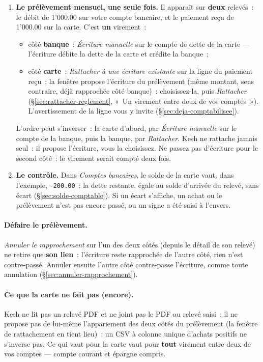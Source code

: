 \documentclass[a4paper,11pt,oneside]{article}
\begin{document}
\begin{enumerate}
    \item \textbf{Le prélèvement mensuel, une seule fois.} Il apparaît sur \textbf{deux} relevés~: le débit de 1'000.00 sur votre compte bancaire, et le paiement reçu de 1'000.00 sur la carte. C'est \textbf{un} virement~:
    \begin{itemize}
        \item côté \textbf{banque}~: \emph{Écriture manuelle} sur le compte de dette de la carte --- l'écriture débite la dette de la carte et crédite la banque~;
        \item côté \textbf{carte}~: \emph{Rattacher à une écriture existante} sur la ligne du paiement reçu~; la fenêtre propose l'écriture du prélèvement (même montant, sens contraire, déjà rapprochée côté banque)~: choisissez-la, puis \emph{Rattacher} (\S\ref{sec:rattacher-reglement}, «~Un virement entre deux de vos comptes~»). L'avertissement de la ligne vous y invite (\S\ref{sec:deja-comptabilisee}).
    \end{itemize}
    L'ordre peut s'inverser~: la carte d'abord, par \emph{Écriture manuelle} sur le compte de la banque, puis la banque, par \emph{Rattacher}. Kesh ne rattache jamais seul~: il propose l'écriture, vous la choisissez. Ne passez pas d'écriture pour le second côté~: le virement serait compté deux fois.
    \item \textbf{Le contrôle.} Dans \emph{Comptes bancaires}, le solde de la carte vaut, dans l'exemple, \texttt{-200.00}~: la dette restante, égale au solde d'arrivée du relevé, sans écart (\S\ref{sec:solde-comptable}). Si un écart s'affiche, un achat ou le prélèvement n'est pas encore passé, ou un signe a été saisi à l'envers.
\end{enumerate}

\paragraph{Défaire le prélèvement.} \emph{Annuler le rapprochement} sur l'un des deux côtés (depuis le détail de son relevé) ne retire que \textbf{son lien}~: l'écriture reste rapprochée de l'autre côté, rien n'est contre-passé. Annuler ensuite l'autre côté contre-passe l'écriture, comme toute annulation (\S\ref{sec:annuler-rapprochement}).

\paragraph{Ce que la carte ne fait pas (encore).} Kesh ne lit pas un relevé PDF et ne joint pas le PDF au relevé saisi~; il ne propose pas de lui-même l'appariement des deux côtés du prélèvement (la fenêtre de rattachement en tient lieu)~; un CSV à colonne unique d'achats positifs ne s'inverse pas. Ce qui vaut pour la carte vaut pour \textbf{tout} virement entre deux de vos comptes --- compte courant et épargne compris.
\end{document}
